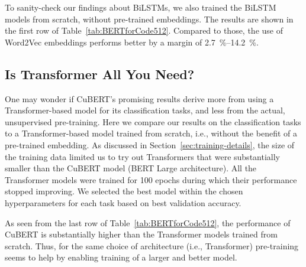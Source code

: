 \documentclass{article}
\newcommand{\BERTforCode}{CuBERT\xspace}
\newcommand{\update}[1]{#1}
\begin{document}
To sanity-check our findings about BiLSTMs, we also trained the BiLSTM models from scratch, without pre-trained embeddings.
The results are shown in the first row of Table~\ref{tab:BERTforCode512}. \update{Compared to those, the use of Word2Vec embeddings performs better by a margin of \SIrange{2.7}{14.2}{\percent}.}

\subsection{Is Transformer All You Need?}
\label{sec:BERTforCodeVsTransformer}

One may wonder if \BERTforCode's promising results derive more from using a Transformer-based model for its classification tasks, and less from the actual, unsupervised pre-training.
Here we compare our results {on the classification tasks} to a Transformer-based model trained from scratch, i.e., without the benefit of a pre-trained embedding.
As discussed in Section~\ref{sec:training-details}, the size of the training data limited us to try out Transformers that were substantially smaller than the CuBERT model (BERT Large architecture).
All the Transformer models were trained for \num{100} epochs during which their performance stopped improving.
We selected the best model within the chosen hyperparameters for each task based on best validation accuracy.

As seen from the last row of Table~\ref{tab:BERTforCode512}, the performance of \BERTforCode is substantially higher than the Transformer models trained from scratch. \update{Thus, for the same choice of architecture (i.e., Transformer) pre-training seems to help by enabling training of a larger and better model.}
\end{document}
